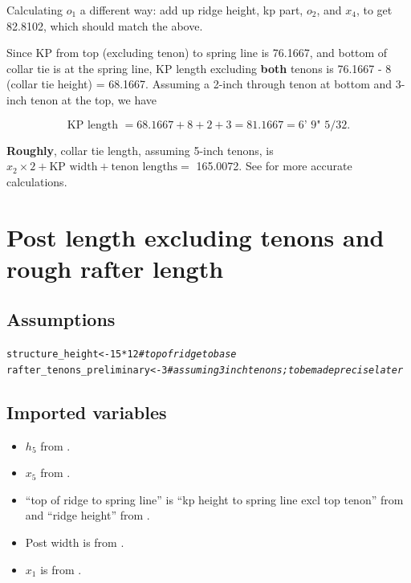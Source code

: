 \documentclass{article}\usepackage[]{graphicx}\usepackage[]{xcolor}
\makeatletter
\newcommand{\hlnum}[1]{\textcolor[rgb]{0.686,0.059,0.569}{#1}}%
\newcommand{\hlcom}[1]{\textcolor[rgb]{0.678,0.584,0.686}{\textit{#1}}}%
\newcommand{\hlopt}[1]{\textcolor[rgb]{0,0,0}{#1}}%
\newcommand{\hlstd}[1]{\textcolor[rgb]{0.345,0.345,0.345}{#1}}%
\newcommand{\hlkwb}[1]{\textcolor[rgb]{0.69,0.353,0.396}{#1}}%
\newenvironment{kframe}{%
 \def\at@end@of@kframe{}%
 \ifinner\ifhmode%
  \def\at@end@of@kframe{\end{minipage}}%
  \begin{minipage}{\columnwidth}%
 \fi\fi%
 \def\FrameCommand##1{\hskip\@totalleftmargin \hskip-\fboxsep
 \colorbox{shadecolor}{##1}\hskip-\fboxsep
     \hskip-\linewidth \hskip-\@totalleftmargin \hskip\columnwidth}%
 \MakeFramed {\advance\hsize-\width
   \@totalleftmargin\z@ \linewidth\hsize
   \@setminipage}}%
 {\par\unskip\endMakeFramed%
 \at@end@of@kframe}
\newenvironment{knitrout}{}{} %
\makeatother
\begin{document}
Calculating $o_1$ a different way: add up ridge height, kp part, $o_2$, and $x_4$, to get 82.8102, which should match the above. 

Since KP from top (excluding tenon) to spring line is 76.1667, and bottom of collar tie is at the spring line, KP length excluding \textbf{both} tenons is 76.1667 - 8 (collar tie height) = 68.1667. Assuming a 2-inch through tenon at bottom and 3-inch tenon at the top, we have 

\[ \boxed{\text{KP length }= 68.1667 + 8 + 2 + 3 = 81.1667 =  \text{6' 9" 5/32}}.\]

\textbf{Roughly}, collar tie length, assuming 5-inch tenons, is $x_2\times 2 + \text{KP width} + \text{tenon lengths} = $ 165.0072. See  for more accurate calculations.








\section{Post length excluding tenons and rough rafter length}\label{posts-and-rafters}


\subsection{Assumptions}\label{posts-rafters-assumptions}
\begin{knitrout}
\color{fgcolor}\begin{kframe}
\begin{alltt}
\hlstd{structure_height} \hlkwb{<-} \hlnum{15}\hlopt{*}\hlnum{12} \hlcom{# top of ridge to base}
\hlstd{rafter_tenons_preliminary} \hlkwb{<-} \hlnum{3} \hlcom{# assuming 3 inch tenons; to be made precise later}
\end{alltt}
\end{kframe}
\end{knitrout}


\subsection{Imported variables} \label{posts-rafters-imported-variables}
\begin{itemize}
  \item $h_5$ from .
  \item $x_5$ from .
  \item ``top of ridge to spring line'' is ``kp height to spring line excl top tenon'' from  and ``ridge height'' from .
  \item Post width is from .
  \item $x_1$ is from .
\end{itemize}
\end{document}
